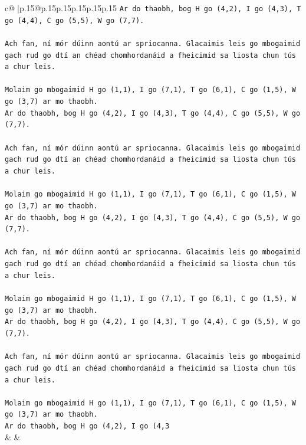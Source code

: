 \documentclass{article}
\begin{document}
{\begin{supertabular}{c@{$\;$}|p{.15\linewidth}@{}p{.15\linewidth}p{.15\linewidth}p{.15\linewidth}p{.15\linewidth}p{.15\linewidth}}
{{{\texttt{Ar do thaobh, bog H go (4,2), I go (4,3), T go (4,4), C go (5,5), W go (7,7).} \\
\\ 
\texttt{Ach fan, ní mór dúinn aontú ar spriocanna. Glacaimis leis go mbogaimid gach rud go dtí an chéad chomhordanáid a fheicimid sa liosta chun tús a chur leis.} \\
\\ 
\texttt{Molaim go mbogaimid H go (1,1), I go (7,1), T go (6,1), C go (1,5), W go (3,7) ar mo thaobh.} \\
\texttt{Ar do thaobh, bog H go (4,2), I go (4,3), T go (4,4), C go (5,5), W go (7,7).} \\
\\ 
\texttt{Ach fan, ní mór dúinn aontú ar spriocanna. Glacaimis leis go mbogaimid gach rud go dtí an chéad chomhordanáid a fheicimid sa liosta chun tús a chur leis.} \\
\\ 
\texttt{Molaim go mbogaimid H go (1,1), I go (7,1), T go (6,1), C go (1,5), W go (3,7) ar mo thaobh.} \\
\texttt{Ar do thaobh, bog H go (4,2), I go (4,3), T go (4,4), C go (5,5), W go (7,7).} \\
\\ 
\texttt{Ach fan, ní mór dúinn aontú ar spriocanna. Glacaimis leis go mbogaimid gach rud go dtí an chéad chomhordanáid a fheicimid sa liosta chun tús a chur leis.} \\
\\ 
\texttt{Molaim go mbogaimid H go (1,1), I go (7,1), T go (6,1), C go (1,5), W go (3,7) ar mo thaobh.} \\
\texttt{Ar do thaobh, bog H go (4,2), I go (4,3), T go (4,4), C go (5,5), W go (7,7).} \\
\\ 
\texttt{Ach fan, ní mór dúinn aontú ar spriocanna. Glacaimis leis go mbogaimid gach rud go dtí an chéad chomhordanáid a fheicimid sa liosta chun tús a chur leis.} \\
\\ 
\texttt{Molaim go mbogaimid H go (1,1), I go (7,1), T go (6,1), C go (1,5), W go (3,7) ar mo thaobh.} \\
\texttt{Ar do thaobh, bog H go (4,2), I go (4,3} \\
            }
        }
    }
    & & \\ \\


\end{supertabular}}
\end{document}
